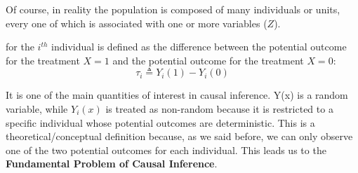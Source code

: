 Of course, in reality the population is composed of many individuals or units,
every one of which is associated with one or more variables ($Z$).
\newline
\begin{definition}
    for the $i^{th}$ individual is defined as the difference between the potential outcome for the treatment
    $X = 1$ and the potential outcome for the treatment $X = 0$:
    \begin{equation}
        \tau_i \triangleq Y_i(1) - Y_i(0)
    \end{equation} 
\end{definition}
\noindent
It is one of the main quantities of interest in causal inference. Y(x) is a random variable, 
while $Y_i(x)$ is treated as non-random because it is restricted to a specific individual
whose potential outcomes are deterministic.
This is a theoretical/conceptual definition because, as we said before, we can only observe one 
of the two potential outcomes for each individual. This leads us to the \textbf{Fundamental Problem of Causal Inference}. 
